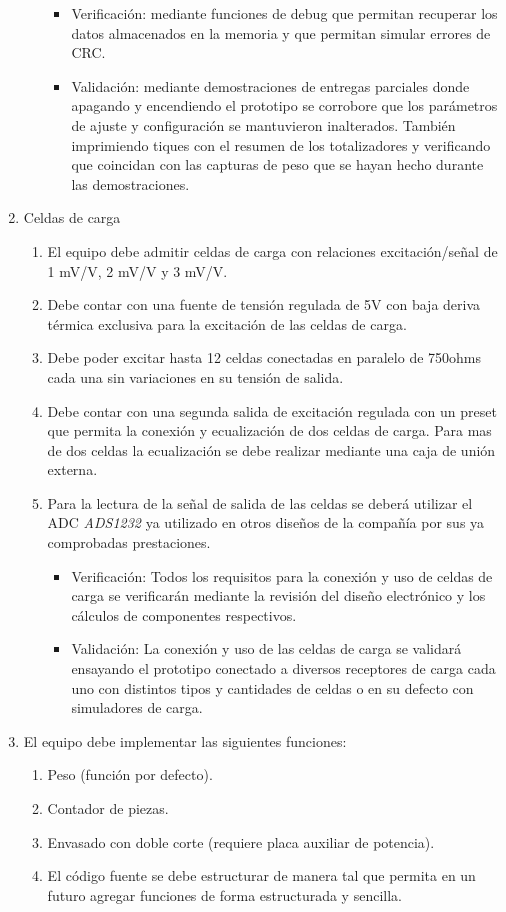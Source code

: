 \documentclass[11pt]{charter}
\begin{document}
\begin{enumerate}
\begin{enumerate}
\begin{itemize}
\item Verificación: mediante funciones de debug que permitan recuperar los datos almacenados en la memoria y que permitan simular errores de CRC.
\item Validación: mediante demostraciones de entregas parciales  donde apagando y encendiendo el prototipo se corrobore que los parámetros de ajuste y configuración se mantuvieron inalterados. También imprimiendo tiques con el resumen de los totalizadores y verificando que coincidan con las capturas de peso que se hayan hecho durante las demostraciones.
\end{itemize}		
	\end{enumerate}	
	
\item Celdas de carga
	\begin{enumerate}
	\item El equipo debe admitir celdas de carga con relaciones excitación/señal de 1 mV/V, 2 mV/V y 3 mV/V.
	\item Debe contar con una fuente de tensión regulada de 5V con baja deriva térmica exclusiva para la excitación de las celdas de carga.
	\item Debe poder excitar hasta 12 celdas conectadas en paralelo de 750ohms cada una sin variaciones en su tensión de salida. 
	\item Debe contar con una segunda salida de excitación regulada con un preset que permita la conexión y ecualización de dos celdas de carga. Para mas de dos celdas la ecualización se debe realizar mediante una caja de unión externa.
	\item Para la lectura de la señal de salida de las celdas se deberá utilizar el ADC \textit{ADS1232} ya utilizado en otros diseños de la compañía por sus ya comprobadas prestaciones.
	
\begin{itemize}
\item Verificación: Todos los requisitos para la conexión y uso de celdas de carga se verificarán mediante la revisión del diseño electrónico y los cálculos de componentes respectivos. 
\item Validación: La conexión y uso de las celdas de carga se validará ensayando el prototipo conectado a diversos receptores de carga cada uno con distintos tipos y cantidades de celdas o en su defecto con simuladores de carga.
\end{itemize}		
	
	\end{enumerate}	
\item El equipo debe implementar las siguientes funciones:
	\begin{enumerate}
	\item Peso (función por defecto).
	\item Contador de piezas.
	\item Envasado con doble corte (requiere placa auxiliar de potencia).
	\item El código fuente se debe estructurar de manera tal que permita en un futuro agregar funciones de forma estructurada y sencilla.
	

\end{enumerate}
\end{enumerate}
\end{document}
